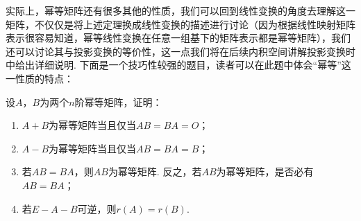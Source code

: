 实际上，幂等矩阵还有很多其他的性质，我们可以回到线性变换的角度去理解这一矩阵，不仅仅是将上述定理换成线性变换的描述进行讨论（因为根据线性映射矩阵表示很容易知道，幂等线性变换在任意一组基下的矩阵表示都是幂等矩阵），我们还可以讨论其与投影变换的等价性，这一点我们将在后续内积空间讲解投影变换时中给出详细说明. 下面是一个技巧性较强的题目，读者可以在此题中体会``幂等''这一性质的特点：
\begin{example}{}{}
    设$A$，$B$为两个$n$阶幂等矩阵，证明：
    \begin{enumerate}
        \item $A+B$为幂等矩阵当且仅当$AB=BA=O$；

        \item $A-B$为幂等矩阵当且仅当$AB=BA=B$；

        \item 若$AB=BA$，则$AB$为幂等矩阵. 反之，若$AB$为幂等矩阵，是否必有$AB=BA$；

        \item 若$E-A-B$可逆，则$r(A)=r(B)$.
    \end{enumerate}
\end{example}

